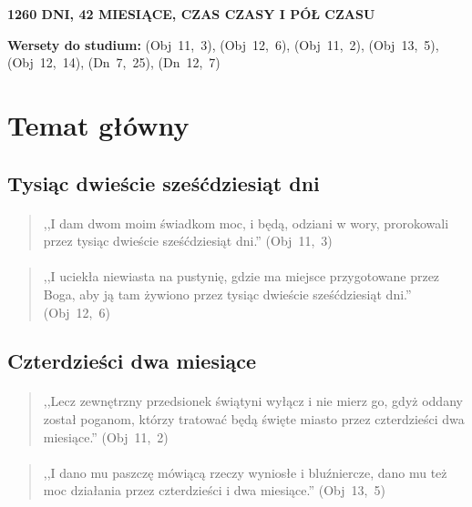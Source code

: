 \documentclass[10pt,a4paper,oneside]{article}
\begin{document}
\centerline{\textbf{\MakeUppercase{1260 dni, 42 miesiące, czas czasy i pół czasu}}}
\begin{center}
\textbf{Wersety do studium:} \mbox{(Obj 11, 3)}, \mbox{(Obj 12, 6)}, \mbox{(Obj 11, 2)}, \mbox{(Obj 13, 5)}, \mbox{(Obj 12, 14)}, \mbox{(Dn 7, 25)}, \mbox{(Dn 12, 7)}
\end{center}
\section{Temat główny}
\subsection{Tysiąc dwieście sześćdziesiąt dni}
\paragraph{}
\begin{quote}
,,I dam dwom moim świadkom moc, i będą, odziani w wory, prorokowali przez tysiąc dwieście sześćdziesiąt dni.'' \mbox{(Obj 11, 3)}
\end{quote}
\paragraph{}
\begin{quote}
,,I uciekła niewiasta na pustynię, gdzie ma miejsce przygotowane przez Boga, aby ją tam żywiono przez tysiąc dwieście sześćdziesiąt dni.'' \mbox{(Obj 12, 6)}
\end{quote}
\subsection{Czterdzieści dwa miesiące}
\paragraph{}
\begin{quote}
,,Lecz zewnętrzny przedsionek świątyni wyłącz i nie mierz go, gdyż oddany został poganom, którzy tratować będą święte miasto przez czterdzieści dwa miesiące.'' \mbox{(Obj 11, 2)}
\end{quote}
\paragraph{}
\begin{quote}
,,I dano mu paszczę mówiącą rzeczy wyniosłe i bluźniercze, dano mu też moc działania przez czterdzieści i dwa miesiące.'' \mbox{(Obj 13, 5)}
\end{quote}
\end{document}
